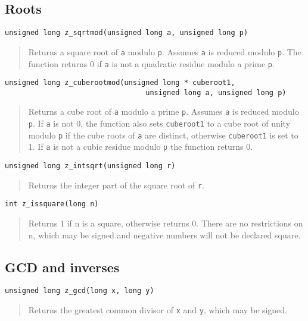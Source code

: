 \documentclass[a4paper,10pt]{article}
\newcommand{\code}{\lstinline}
\begin{document}
\subsection{Roots}

\begin{lstlisting}
unsigned long z_sqrtmod(unsigned long a, unsigned long p)
\end{lstlisting}
\begin{quote}
Returns a square root of \code{a} modulo \code{p}. Assumes \code{a} is reduced modulo \code{p}. The function returns 0 if \code{a} is not a quadratic residue modulo a prime \code{p}.
\end{quote}

\begin{lstlisting}
unsigned long z_cuberootmod(unsigned long * cuberoot1, 
                                 unsigned long a, unsigned long p)
\end{lstlisting}
\begin{quote}
Returns a cube root of \code{a} modulo a prime \code{p}. Assumes \code{a} is reduced modulo \code{p}. If \code{a} is not 0, the function also sets \code{cuberoot1} to a cube root of unity modulo \code{p} if the cube roots of \code{a} are distinct, otherwise \code{cuberoot1} is set to 1. If \code{a} is not a cubic residue modulo \code{p} the function returns 0.
\end{quote}

\begin{lstlisting}
unsigned long z_intsqrt(unsigned long r)
\end{lstlisting}
\begin{quote}
Returns the integer part of the square root of \code{r}. 
\end{quote}

\begin{lstlisting}
int z_issquare(long n)
\end{lstlisting}
\begin{quote}
Returns 1 if n is a square, otherwise returns 0. There are no restrictions on n, which may be signed and negative numbers will not be declared square. 
\end{quote}

\subsection{GCD and inverses}

\begin{lstlisting}
unsigned long z_gcd(long x, long y)
\end{lstlisting}
\begin{quote}
Returns the greatest common divisor of \code{x} and \code{y}, which may be signed.
\end{quote}
\end{document}
